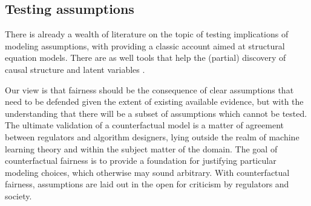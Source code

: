\subsection{Testing assumptions}

There is already a wealth of literature on the topic of testing implications of modeling assumptions, with \citep{bollen:93} providing a classic account aimed at structural equation models. There are as well tools that help the (partial) discovery of causal structure \citep{sgs:00,peters:14} and latent variables \citep{silva:10b,HalpernSontag_uai13,anima:14}.

Our view is that fairness should be the consequence of clear assumptions that need to be defended given the extent of existing available evidence, but with the understanding that there will be a subset of assumptions which cannot be tested. The ultimate validation of a counterfactual model is a matter of agreement between regulators and algorithm designers, lying outside the realm of machine learning theory and within the subject matter of the domain. The goal of counterfactual fairness is to provide a foundation for justifying particular modeling choices, which otherwise may sound arbitrary. With counterfactual fairness, assumptions are laid out in the open for criticism by regulators and society.

